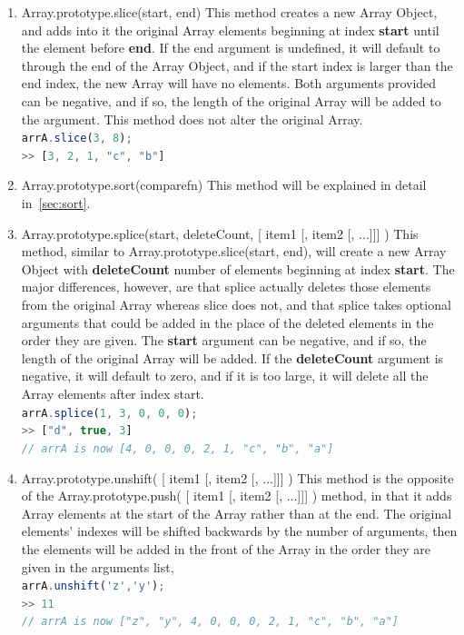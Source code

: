 \documentclass[a4paper,11pt,twoside]{report}
\def\jsinline{\lstinline[language=JavaScript, basicstyle=\small]}%\end{lstlisting}
\begin{document}
\begin{enumerate}
\item Array.prototype.slice(start, end) \newline
This method creates a new Array Object, and adds into it the original Array elements beginning at index \textbf{start} until the element before \textbf{end}. If the end argument is undefined, it will default to through the end of the Array Object, and if the start index is larger than the end index, the new Array will have no elements. Both arguments provided can be negative, and if so, the length of the original Array will be added to the argument. This method does not alter the original Array.\\
\jsinline|arrA.slice(3, 8);|\\
\jsinline|>> [3, 2, 1, "c", "b"]|

\item Array.prototype.sort(comparefn) \newline
This method will be explained in detail in~\ref{sec:sort}.

\item Array.prototype.splice(start, deleteCount, [ item1 [, item2 [, ...]]] ) \newline
This method, similar to Array.prototype.slice(start, end), will create a new Array Object with \textbf{deleteCount} number of elements beginning at index \textbf{start}. The major differences, however, are that splice actually deletes those elements from the original Array whereas slice does not, and that splice takes optional arguments that could be added in the place of the deleted elements in the order they are given. The \textbf{start} argument can be negative, and if so, the length of the original Array will be added. If the \textbf{deleteCount} argument is negative, it will default to zero, and if it is too large, it will delete all the Array elements after index start. \\
\jsinline|arrA.splice(1, 3, 0, 0, 0);|\\
\jsinline|>> ["d", true, 3]| \\
\jsinline|// arrA is now [4, 0, 0, 0, 2, 1, "c", "b", "a"]|

\item Array.prototype.unshift( [ item1 [, item2 [, ...]]] ) \newline
This method is the opposite of the Array.prototype.push( [ item1 [, item2 [, ...]]] ) method, in that it adds Array elements at the start of the Array rather than at the end. The original elements' indexes will be shifted backwards by the number of arguments, then the elements will be added in the front of the Array in the order they are given in the arguments list, \\
\jsinline|arrA.unshift('z','y');|\\
\jsinline|>> 11| \\
\jsinline|// arrA is now ["z", "y", 4, 0, 0, 0, 2, 1, "c", "b", "a"]|


\end{enumerate}
\end{document}
